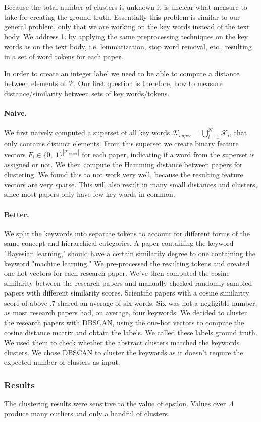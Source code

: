 Because the total number of clusters is unknown it is unclear what measure to take for creating the ground truth. Essentially this problem is similar to our general problem, only that we are working on the key words instead of the text body. We address 1. by applying the same preprocessing techniques on the key words as on the text body, i.e. lemmatization, stop word removal, etc., resulting in a set of word tokens for each paper.

In order to create an integer label we need to be able to compute a distance between elements of $ \mathcal{P} $. Our first question is therefore, how to measure distance/similarity between sets of key words/tokens. 

\paragraph{Naive.}
We first naively computed a superset of all key words $ \mathcal{K}_{super} = \bigcup_{i=1}^{N} \mathcal{K}_{i} $, that only contains distinct elements. From this superset we create binary feature vectors $ F_{i} \in \{0,\; 1 \}^{|\mathcal{K}_{super}|} $ for each paper, indicating if a word from the superset is assigned or not. We then compute the Hamming distance between papers for clustering. We found this to not work very well, because the resulting feature vectors are very sparse. This will also result in many small distances and clusters, since most papers only have few key words in common. 

\paragraph{Better.}
We split the keywords into separate tokens to account for different forms of the same concept and hierarchical categories. A paper containing the keyword "Bayesian learning," should have a certain similarity degree to one containing the keyword "machine learning." We pre-processed the resulting tokens and created one-hot vectors for each research paper. We've then computed the cosine similarity between the research papers and manually checked randomly sampled papers with different similarity scores. Scientific papers with a cosine similarity score of above .7 shared an average of six words. Six was not a negligible number, as most research papers had, on average, four keywords. We decided to cluster the research papers with DBSCAN, using the one-hot vectors to compute the cosine distance matrix and obtain the labels. We called these labels ground truth. We used them to check whether the abstract clusters matched the keywords clusters. We chose DBSCAN to cluster the keywords as it doesn't require the expected number of clusters as input. 

\subsubsection{Results}
The clustering results were sensitive to the value of epsilon. Values over .4 produce many outliers and only a handful of clusters. 
